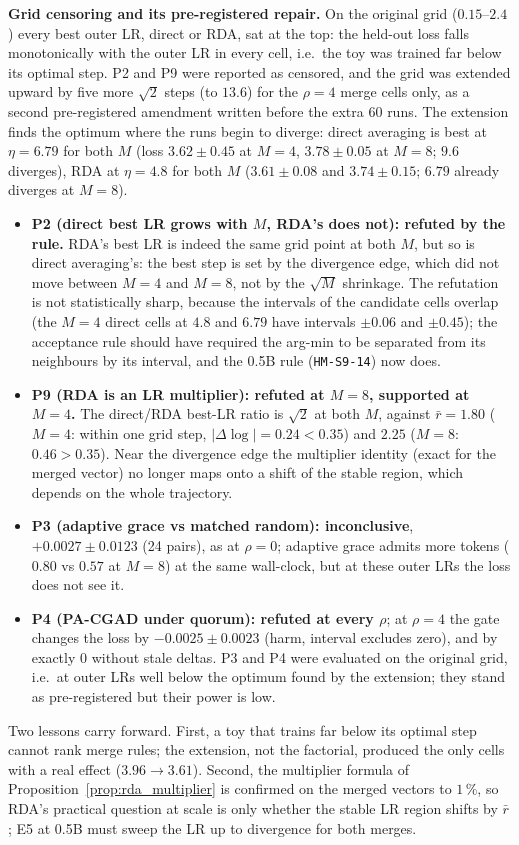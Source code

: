 \documentclass[11pt,a4paper]{article}
\begin{document}
\textbf{Grid censoring and its pre-registered repair.} On the original grid ($0.15$--$2.4$) every best outer LR, direct or RDA, sat at the top: the held-out loss falls monotonically with the outer LR in every cell, i.e.\ the toy was trained far below its optimal step. P2 and P9 were reported as censored, and the grid was extended upward by five more $\sqrt2$ steps (to $13.6$) for the $\rho=4$ merge cells only, as a second pre-registered amendment written before the extra 60 runs. The extension finds the optimum where the runs begin to diverge: direct averaging is best at $\eta=6.79$ for both $M$ (loss $3.62 \pm 0.45$ at $M=4$, $3.78 \pm 0.05$ at $M=8$; $9.6$ diverges), RDA at $\eta=4.8$ for both $M$ ($3.61 \pm 0.08$ and $3.74 \pm 0.15$; $6.79$ already diverges at $M=8$).
\begin{itemize}[leftmargin=1.8em]
    \item \textbf{P2 (direct best LR grows with $M$, RDA's does not): refuted by the rule.} RDA's best LR is indeed the same grid point at both $M$, but so is direct averaging's: the best step is set by the divergence edge, which did not move between $M=4$ and $M=8$, not by the $\sqrt{M}$ shrinkage. The refutation is not statistically sharp, because the intervals of the candidate cells overlap (the $M=4$ direct cells at $4.8$ and $6.79$ have intervals $\pm0.06$ and $\pm0.45$); the acceptance rule should have required the arg-min to be separated from its neighbours by its interval, and the 0.5B rule (\texttt{HM-S9-14}) now does.
    \item \textbf{P9 (RDA is an LR multiplier): refuted at $M=8$, supported at $M=4$.} The direct/RDA best-LR ratio is $\sqrt2$ at both $M$, against $\bar r = 1.80$ ($M=4$: within one grid step, $|\Delta\log| = 0.24 < 0.35$) and $2.25$ ($M=8$: $0.46 > 0.35$). Near the divergence edge the multiplier identity (exact for the merged vector) no longer maps onto a shift of the stable region, which depends on the whole trajectory.
    \item \textbf{P3 (adaptive grace vs matched random): inconclusive}, $+0.0027 \pm 0.0123$ (24 pairs), as at $\rho=0$; adaptive grace admits more tokens ($0.80$ vs $0.57$ at $M=8$) at the same wall-clock, but at these outer LRs the loss does not see it.
    \item \textbf{P4 (PA-CGAD under quorum): refuted at every $\rho$}; at $\rho=4$ the gate changes the loss by $-0.0025 \pm 0.0023$ (harm, interval excludes zero), and by exactly $0$ without stale deltas. P3 and P4 were evaluated on the original grid, i.e.\ at outer LRs well below the optimum found by the extension; they stand as pre-registered but their power is low.
\end{itemize}
Two lessons carry forward. First, a toy that trains far below its optimal step cannot rank merge rules; the extension, not the factorial, produced the only cells with a real effect ($3.96 \to 3.61$). Second, the multiplier formula of Proposition~\ref{prop:rda_multiplier} is confirmed on the merged vectors to $1\,\%$, so RDA's practical question at scale is only whether the stable LR region shifts by $\bar r$; E5 at 0.5B must sweep the LR up to divergence for both merges.
\end{document}

